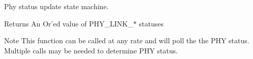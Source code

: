 Phy status update state machine. 

\begin{DoxyReturn}{Returns}
An Or'ed value of P\+H\+Y\+\_\+\+L\+I\+N\+K\+\_\+$\ast$ statuses 
\end{DoxyReturn}
\begin{DoxyNote}{Note}
This function can be called at any rate and will poll the the P\+H\+Y status. Multiple calls may be needed to determine P\+H\+Y status. 
\end{DoxyNote}
